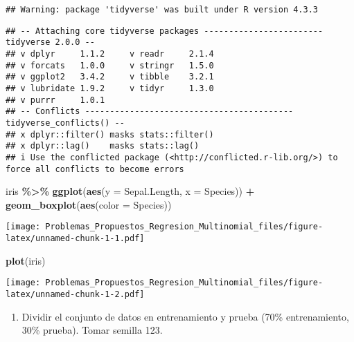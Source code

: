 \documentclass[
]{article}
\newenvironment{Shaded}{\begin{snugshade}}{\end{snugshade}}
\newcommand{\AttributeTok}[1]{\textcolor[rgb]{0.13,0.29,0.53}{#1}}
\newcommand{\FunctionTok}[1]{\textcolor[rgb]{0.13,0.29,0.53}{\textbf{#1}}}
\newcommand{\NormalTok}[1]{#1}
\newcommand{\SpecialCharTok}[1]{\textcolor[rgb]{0.81,0.36,0.00}{\textbf{#1}}}
\providecommand{\tightlist}{%
  \setlength{\itemsep}{0pt}\setlength{\parskip}{0pt}}
\begin{document}
\begin{verbatim}
## Warning: package 'tidyverse' was built under R version 4.3.3
\end{verbatim}

\begin{verbatim}
## -- Attaching core tidyverse packages ------------------------ tidyverse 2.0.0 --
## v dplyr     1.1.2     v readr     2.1.4
## v forcats   1.0.0     v stringr   1.5.0
## v ggplot2   3.4.2     v tibble    3.2.1
## v lubridate 1.9.2     v tidyr     1.3.0
## v purrr     1.0.1     
## -- Conflicts ------------------------------------------ tidyverse_conflicts() --
## x dplyr::filter() masks stats::filter()
## x dplyr::lag()    masks stats::lag()
## i Use the conflicted package (<http://conflicted.r-lib.org/>) to force all conflicts to become errors
\end{verbatim}

\begin{Shaded}
\begin{Highlighting}[]
\NormalTok{iris }\SpecialCharTok{\%\textgreater{}\%}
\FunctionTok{ggplot}\NormalTok{(}\FunctionTok{aes}\NormalTok{(}\AttributeTok{y =}\NormalTok{ Sepal.Length, }\AttributeTok{x =}\NormalTok{ Species)) }\SpecialCharTok{+} \FunctionTok{geom\_boxplot}\NormalTok{(}\FunctionTok{aes}\NormalTok{(}\AttributeTok{color =}\NormalTok{ Species)) }
\end{Highlighting}
\end{Shaded}

\texttt{[image: Problemas\_Propuestos\_Regresion\_Multinomial\_files/figure-latex/unnamed-chunk-1-1.pdf]}

\begin{Shaded}
\begin{Highlighting}[]
\FunctionTok{plot}\NormalTok{(iris)}
\end{Highlighting}
\end{Shaded}

\texttt{[image: Problemas\_Propuestos\_Regresion\_Multinomial\_files/figure-latex/unnamed-chunk-1-2.pdf]}

\begin{enumerate}
\def\labelenumi{\arabic{enumi})}
\setcounter{enumi}{1}
\tightlist
\item
  Dividir el conjunto de datos en entrenamiento y prueba (70\%
  entrenamiento, 30\% prueba). Tomar semilla 123.
\end{enumerate}
\end{document}
